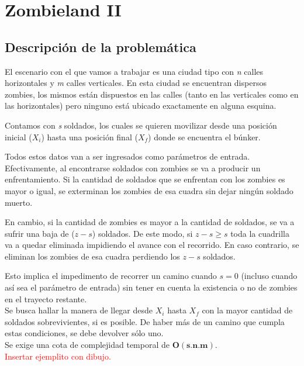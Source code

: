 \section{Zombieland II}
\subsection{Descripci\'on de la problem\'atica}


El escenario con el que vamos a trabajar es una ciudad tipo con \emph{n} calles horizontales y \emph{m} calles verticales. En esta ciudad se encuentran dispersos zombies, los mismos est\'an dispuestos en las calles (tanto en las verticales como en las horizontales) pero ninguno est\'a ubicado exactamente en alguna esquina. 

Contamos con \emph{s} soldados, los cuales se quieren movilizar desde una posici\'on inicial ($X_i$) hasta una posici\'on final ($X_f$) donde se encuentra el b\'unker.

Todos estos datos van a ser ingresados como par\'ametros de entrada.\\

Efectivamente, al encontrarse soldados con zombies se va a producir un enfrentamiento. Si la cantidad de soldados que se enfrentan con los zombies es mayor o igual, se exterminan los zombies de esa cuadra sin dejar ning\'un soldado muerto. 

En cambio, si la cantidad de zombies es mayor a la cantidad de soldados, se va a sufrir una baja de ($z-s$) soldados. De este modo, si $z-s\geq s$ toda la cuadrilla va a quedar eliminada impidiendo el avance con el recorrido. En caso contrario, se eliminan los zombies de esa cuadra perdiendo los $z-s$ soldados.

Esto implica el impedimento de recorrer un camino cuando $s=0$ (incluso cuando as\'i sea el par\'ametro de entrada) sin tener en cuenta la existencia o no de zombies en el trayecto restante.\\

Se busca hallar la manera de llegar desde $X_i$ hasta $X_f$ con la mayor cantidad de soldados sobrevivientes, si es posible. De haber m\'as de un camino que cumpla estas condiciones, se debe devolver s\'olo uno.\\

Se exige una cota de complejidad temporal de $\mathbf{O(s.n.m)}$.\\

\textcolor{red}{Insertar ejemplito con dibujo.}

